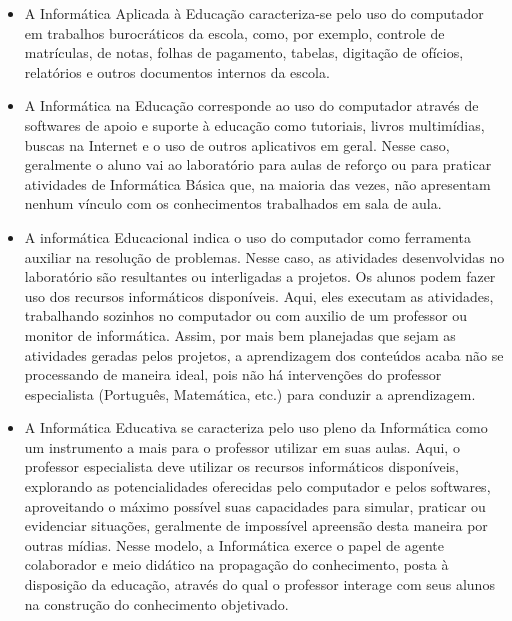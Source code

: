 \documentclass[a4paper,12pt]{report}
\begin{document}
    \begin{itemize}

        \item A Informática Aplicada à Educação caracteriza-se pelo uso do
        computador em trabalhos burocráticos da escola, como, por exemplo,
        controle de matrículas, de notas, folhas de pagamento, tabelas,
        digitação de ofícios, relatórios e outros documentos internos da escola.

        \item A Informática na Educação corresponde ao uso do computador através
        de softwares de apoio e suporte à educação como tutoriais, livros
        multimídias, buscas na Internet e o uso de outros aplicativos em geral.
        Nesse caso, geralmente o aluno vai ao laboratório para aulas de reforço
        ou para praticar atividades de Informática Básica que, na maioria das
        vezes, não apresentam nenhum vínculo com os conhecimentos trabalhados em
        sala de aula.

        \item A informática Educacional indica o uso do computador como
        ferramenta auxiliar na resolução de problemas. Nesse caso, as atividades
        desenvolvidas no laboratório são resultantes ou interligadas a projetos.
        Os alunos podem fazer uso dos recursos informáticos disponíveis. Aqui,
        eles executam as atividades, trabalhando sozinhos no computador ou com
        auxilio de um professor ou monitor de informática. Assim, por mais bem
        planejadas que sejam as atividades geradas pelos projetos, a
        aprendizagem dos conteúdos acaba não se processando de maneira ideal,
        pois não há intervenções do professor especialista (Português,
        Matemática, etc.) para conduzir a aprendizagem.

        \item A Informática Educativa se caracteriza pelo uso pleno da
        Informática como um instrumento a mais para o professor utilizar em suas
        aulas. Aqui, o professor especialista deve utilizar os recursos
        informáticos disponíveis, explorando as potencialidades oferecidas pelo
        computador e pelos softwares, aproveitando o máximo possível suas
        capacidades para simular, praticar ou evidenciar situações, geralmente
        de impossível apreensão desta maneira por outras mídias. Nesse modelo, a
        Informática exerce o papel de agente colaborador e meio didático na
        propagação do conhecimento, posta à disposição da educação, através do
        qual o professor interage com seus alunos na construção do conhecimento
        objetivado.

    \end{itemize}
\end{document}
